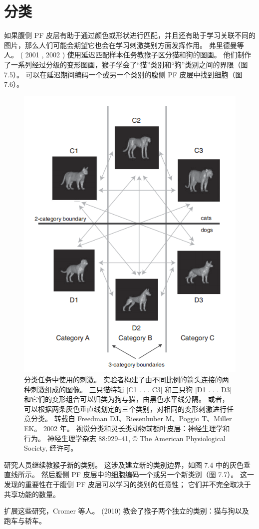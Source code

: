\section{分类}
\par
如果腹侧 PF 皮层有助于通过颜色或形状进行匹配，并且还有助于学习关联不同的图片，那么人们可能会期望它也会在学习刺激类别方面发挥作用。 
弗里德曼等人。 ( 2001 , 2002 ) 使用延迟匹配样本任务教猴子区分猫和狗的图画。 
他们制作了一系列经过分级的变形图画，猴子学会了“猫”类别和“狗”类别之间的界限（图 7.5）。 
可以在延迟期间编码一个或另一个类别的腹侧 PF 皮层中找到细胞（图 7.6）。
\begin{figure}
	\centering
	\includegraphics[width=0.6\linewidth]{image_pfc/Fig_7_5}
	\caption{分类任务中使用的刺激。 
		实验者构建了由不同比例的箭头连接的两种刺激组成的图像。 
		三只猫特辑 [C1 . . . C3] 和三只狗 [D1 . . . D3] 和它们的变形组合可以归类为狗与猫，由黑色水平线分隔。 
		或者，可以根据两条灰色垂直线划定的三个类别，对相同的变形刺激进行任意分类。 
		转载自 Freedman DJ、Riesenhuber M、Poggio T、Miller EK。 2002 年。 
		视觉分类和灵长类动物前额叶皮层：神经生理学和行为。 
		神经生理学杂志 88:929–41, © The American Physiological Society, 经许可。}
	\label{fig:fig}
\end{figure}
\par
研究人员继续教猴子新的类别。 
这涉及建立新的类别边界，如图 7.4 中的灰色垂直线所示。 
然后腹侧 PF 皮层中的细胞编码一个或另一个新类别（图 7.7）。 
这一发现的重要性在于腹侧 PF 皮层可以学习的类别的任意性； 
它们并不完全取决于共享功能的数量。
\par
扩展这些研究，Cromer 等人。 (2010) 教会了猴子两个独立的类别：猫与狗以及跑车与轿车。
